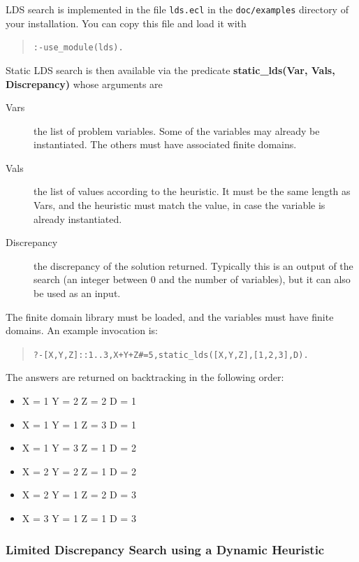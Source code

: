 LDS search is implemented in the file
{\tt lds.ecl} in the {\tt doc/examples} directory of your
{\eclipse} installation. You can copy this file and load it with
\begin{quote}\begin{alltt}
:- use_module(lds).
\end{alltt}\end{quote}
Static LDS search is then available via the predicate
{\bf static_lds(Var, Vals, Discrepancy)} whose arguments are
\begin{description}
\item[Vars] the list of problem variables.  Some of the
variables may already be instantiated.  The others
must have associated finite domains.
\item[Vals] the list of values according to the heuristic.  It
must be the same length as Vars, and the heuristic
must match the value, in case the variable is
already instantiated.
\item[Discrepancy] the discrepancy of the solution returned.  Typically this
is an output of the search (an integer between $0$ and the number of
variables), but it can also be used as an input.
\end{description}
The finite domain library must be loaded, and the variables must have
finite domains.  An example invocation is:
\begin{quote}\begin{alltt}
?- [X,Y,Z]::1..3, X+Y+Z#=5, static_lds([X,Y,Z],[1,2,3],D).
\end{alltt}\end{quote}
The answers are returned on backtracking in the following order:
\begin{itemize}
\item
X = 1
Y = 2
Z = 2
D = 1     
\item
X = 1
Y = 1
Z = 3
D = 1     
\item
X = 1
Y = 3
Z = 1
D = 2     
\item
X = 2
Y = 2
Z = 1
D = 2     
\item
X = 2
Y = 1
Z = 2
D = 3     
\item
X = 3
Y = 1
Z = 1
D = 3
\end{itemize}


\subsubsection{Limited Discrepancy Search using a Dynamic Heuristic}

